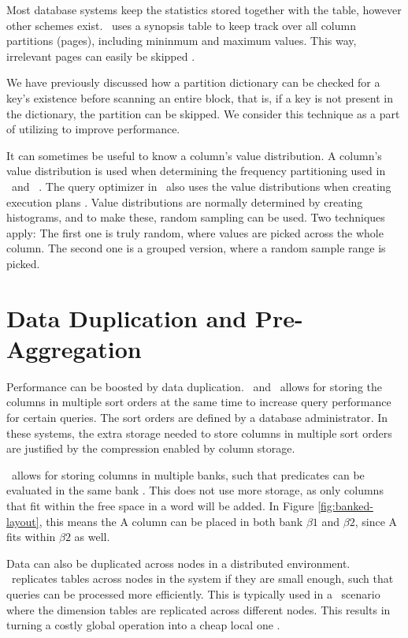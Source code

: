 Most database systems keep the statistics stored together with the table, however other schemes exist. \ibm~uses a synopsis table to keep track over all column partitions (pages), including mininmum and maximum values. This way, irrelevant pages can easily be skipped \cite{Raman2013-em}.

We have previously discussed how a partition dictionary can be checked for a key's existence before scanning an entire block, that is, if a key is not present in the dictionary, the partition can be skipped. We consider this technique as a part of utilizing  to improve performance.

It can sometimes be useful to know a column's value distribution. A column's value distribution is used when determining the frequency partitioning used in \blink~and \ibm~\cite{Raman2008-gi, Raman2013-em}. The query optimizer in \mssql~also uses the value distributions when creating execution plans \cite{Larson2013-mc}. Value distributions are normally determined by creating histograms, and to make these, random sampling can be used. Two techniques apply: The first one is truly random, where values are picked across the whole column. The second one is a grouped version, where a random sample range is picked.

\section{Data Duplication and Pre-Aggregation}
\label{sec:Data Duplication and Pre-Aggregation}
Performance can be boosted by data duplication. \cstore~and \vertica~allows for storing the columns in multiple sort orders at the same time \cite{Stonebraker2005-qz, Lamb2012-kg} to increase query performance for certain queries. The sort orders are defined by a database administrator. In these systems, the extra storage needed to store columns in multiple sort orders are justified by the compression enabled by column storage.

\blink~allows for storing columns in multiple banks, such that predicates can be evaluated in the same bank \cite{Johnson2008-cp}. This does not use more storage, as only columns that fit within the free space in a word will be added. In Figure \ref{fig:banked-layout}, this means the A column can be placed in both bank $\beta 1$ and $\beta 2$, since A fits within $\beta 2$ as well.

Data can also be duplicated across nodes in a distributed environment. \exasol~replicates tables across nodes in the system if they are small enough, such that queries can be processed more efficiently. This is typically used in a \bi~scenario where the dimension tables are replicated across different nodes. This results in turning a costly global operation into a cheap local one \cite{Exasol2014-xh}.

